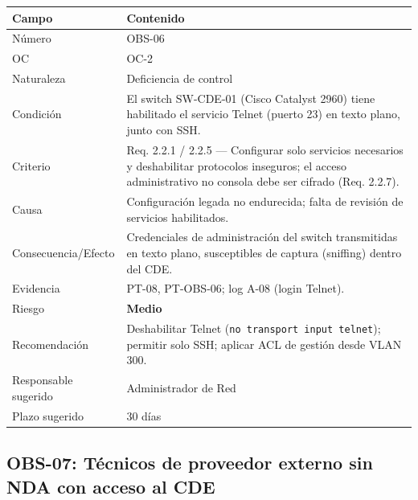 \documentclass[11pt,a4paper]{article}
\begin{document}
\begin{tabularx}{\textwidth}{P{5cm}L}
\toprule
\textbf{Campo} & \textbf{Contenido} \\
\midrule
Número & OBS-06 \\
OC & OC-2 \\
Naturaleza & Deficiencia de control \\
Condición & El switch SW-CDE-01 (Cisco Catalyst 2960) tiene habilitado el servicio Telnet (puerto 23) en texto plano, junto con SSH. \\
Criterio & Req. 2.2.1 / 2.2.5 — Configurar solo servicios necesarios y deshabilitar protocolos inseguros; el acceso administrativo no consola debe ser cifrado (Req. 2.2.7). \\
Causa & Configuración legada no endurecida; falta de revisión de servicios habilitados. \\
Consecuencia/Efecto & Credenciales de administración del switch transmitidas en texto plano, susceptibles de captura (sniffing) dentro del CDE. \\
Evidencia & PT-08, PT-OBS-06; log A-08 (login Telnet). \\
Riesgo & \textbf{Medio} \\
Recomendación & Deshabilitar Telnet (\texttt{no transport input telnet}); permitir solo SSH; aplicar ACL de gestión desde VLAN 300. \\
Responsable sugerido & Administrador de Red \\
Plazo sugerido & 30 días \\
\bottomrule
\end{tabularx}

\subsection{OBS-07: Técnicos de proveedor externo sin NDA con acceso al CDE}
\end{document}
